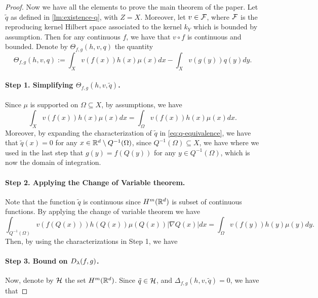\begin{proof}
Now we have all the elements to prove the main theorem of the paper. Let $\tilde{q}$ as defined in \cref{lm:existence-q}, with $Z = X$. Moreover, let
$v \in {\cal F}$, where ${\cal F}$ is the reproducing kernel Hilbert space associated to the kernel $k_Y$ which is bounded by assumption. Then for any continuous $f$, we have that $v \circ f$ is continuous and bounded.
Denote by $\Theta_{f,g}(h,v,q)$ the quantity
$$\Theta_{f,g}(h,v,q) := \int_X v(f(x)) h(x) \mu(x) dx - \int_X v(g(y)) q(y) dy.$$
%
\paragraph{Step 1. Simplifying $\Theta_{f,g}(h,v,\tilde{q})$.}
Since $\mu$ is supported on $\Omega \subseteq X$, by assumptions, we have
$$\int_X v(f(x)) h(x) \mu(x) dx = \int_\Omega v(f(x)) h(x) \mu(x) dx.$$
Moreover, by expanding the characterization of $\tilde{q}$ in \cref{eq:q-equivalence}, we have that $\tilde{q}(x) = 0$ for any $x \in \mathbb R^d \setminus Q^{-1}(\Omega)$, since $Q^{-1}(\Omega) \subseteq X$, we have
where we used in the last step that $g(y) = f(Q(y))$ for any $y \in Q^{-1}(\Omega)$, which is now the domain of integration.
%
\paragraph{Step 2. Applying the Change of Variable theorem.}
Note that the function $\tilde{q}$ is continuous since $H^m(\mathbb R^d)$ is subset of continuous functions. By applying the change of variable theorem we have
$$\int_{Q^{-1}(\Omega)} v(f(Q(x))) h(Q(x)) \mu(Q(x)) |\nabla Q(x)| dx = \int_{\Omega} v(f(y)) h(y) \mu(y) dy.$$
Then, by using the characterizations in Step 1, we have

\paragraph{Step 3. Bound on $D_\lambda(f, g)$.}
Now, denote by $\mathcal H$ the set $H^m(\mathbb R^d)$. Since $\tilde{q} \in \mathcal H$, and $\Delta_{f, g}(h,v,\tilde{q}) = 0$, we have that


\end{proof}
